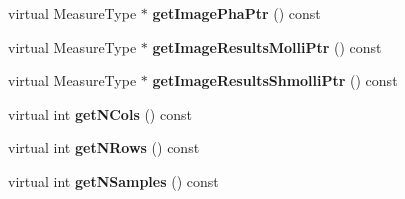 \begin{DoxyCompactItemize}
\item 
\hypertarget{class_ox_1_1_test_image_a6e7c4c1195dfd0c1938c913b230b48a7}{virtual Measure\-Type $\ast$ {\bfseries get\-Image\-Pha\-Ptr} () const }\label{class_ox_1_1_test_image_a6e7c4c1195dfd0c1938c913b230b48a7}

\item 
\hypertarget{class_ox_1_1_test_image_a9da80782972a99cae274cde3de03bbda}{virtual Measure\-Type $\ast$ {\bfseries get\-Image\-Results\-Molli\-Ptr} () const }\label{class_ox_1_1_test_image_a9da80782972a99cae274cde3de03bbda}

\item 
\hypertarget{class_ox_1_1_test_image_aef09efd3eb4b1a37d3b6b479d1e4a016}{virtual Measure\-Type $\ast$ {\bfseries get\-Image\-Results\-Shmolli\-Ptr} () const }\label{class_ox_1_1_test_image_aef09efd3eb4b1a37d3b6b479d1e4a016}

\item 
\hypertarget{class_ox_1_1_test_image_af5a9aadf12db9fdff87ed6aff4e0a2ef}{virtual int {\bfseries get\-N\-Cols} () const }\label{class_ox_1_1_test_image_af5a9aadf12db9fdff87ed6aff4e0a2ef}

\item 
\hypertarget{class_ox_1_1_test_image_acdc29d077640af69c4caac7c60d31cd6}{virtual int {\bfseries get\-N\-Rows} () const }\label{class_ox_1_1_test_image_acdc29d077640af69c4caac7c60d31cd6}

\item 
\hypertarget{class_ox_1_1_test_image_a87559c865b1f365c0bd7cfc9c5939d2b}{virtual int {\bfseries get\-N\-Samples} () const }\label{class_ox_1_1_test_image_a87559c865b1f365c0bd7cfc9c5939d2b}

\end{DoxyCompactItemize}
